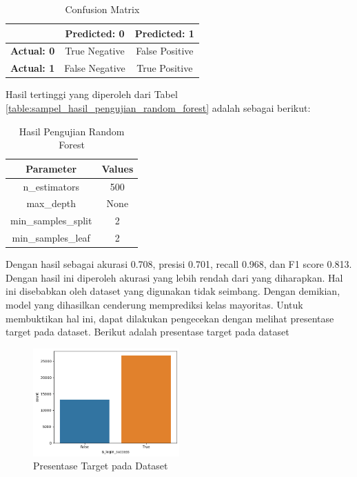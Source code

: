 \begin{table}[H]
    \centering
    \begin{tabular}{|c|c|c|}
    \hline
     & \textbf{Predicted: 0} & \textbf{Predicted: 1} \\
    \hline
    \textbf{Actual: 0} & True Negative & False Positive \\
    \hline
    \textbf{Actual: 1} & False Negative & True Positive \\
    \hline
    \end{tabular}
    \caption{Confusion Matrix}
    \label{table:1}
\end{table}

Hasil tertinggi yang diperoleh dari Tabel \ref{table:sampel_hasil_pengujian_random_forest} adalah sebagai berikut:

\begin{table}[H]
    \centering
    \begin{tabular}{|c|c|}
    \hline
    \textbf{Parameter} & \textbf{Values} \\
    \hline
    n\_estimators & 500 \\
    \hline
    max\_depth & None \\
    \hline
    min\_samples\_split & 2 \\
    \hline
    min\_samples\_leaf & 2 \\
    \hline
    \end{tabular}
    \caption{Hasil Pengujian Random Forest}
    \label{table:2}
    \end{table}

Dengan hasil sebagai akurasi 0.708, presisi 0.701, recall 0.968, dan F1 score 0.813. Dengan hasil ini diperoleh akurasi yang lebih rendah dari yang diharapkan. Hal ini disebabkan oleh dataset yang digunakan tidak seimbang. Dengan demikian, model yang dihasilkan cenderung memprediksi kelas mayoritas. Untuk membuktikan hal ini, dapat dilakukan pengecekan dengan melihat presentase target pada dataset. Berikut adalah presentase target pada dataset

\begin{figure}[H]
    \centering
    \includegraphics[width=0.5\textwidth]{contents/chapter-6/visualize_class.png}
    \caption{Presentase Target pada Dataset}
    \label{fig:visualize_target}
\end{figure}

